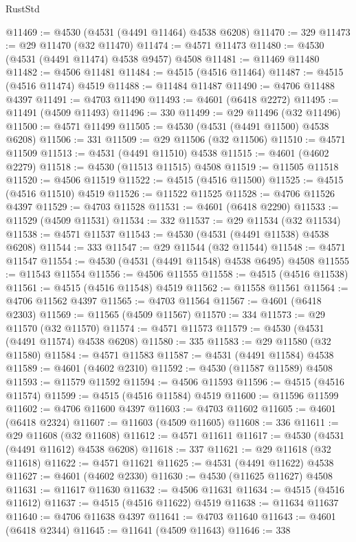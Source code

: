 \begin{lexlean}{RustStd}
\begin{coremodule}
{\begin{coremodule}
{{{{{{{{{{{{{{{{{{{{{{{{{{{{{{{{{{{{{{{{{{{{{{{{{{{{{{{@11469 := @4530 (@4531 (@4491 @11464) @4538 @6208)
@11470 := 329
@11473 := @29 @11470 (@32 @11470)
@11474 := @4571 @11473
@11480 := @4530 (@4531 (@4491 @11474) @4538 @9457) @4508
@11481 := @11469 @11480
@11482 := @4506 @11481
@11484 := @4515 (@4516 @11464)
@11487 := @4515 (@4516 @11474) @4519
@11488 := @11484 @11487
@11490 := @4706 @11488 @4397
@11491 := @4703 @11490
@11493 := @4601 (@6418 @2272)
@11495 := @11491 (@4509 @11493)
@11496 := 330
@11499 := @29 @11496 (@32 @11496)
@11500 := @4571 @11499
@11505 := @4530 (@4531 (@4491 @11500) @4538 @6208)
@11506 := 331
@11509 := @29 @11506 (@32 @11506)
@11510 := @4571 @11509
@11513 := @4531 (@4491 @11510) @4538
@11515 := @4601 (@4602 @2279)
@11518 := @4530 (@11513 @11515) @4508
@11519 := @11505 @11518
@11520 := @4506 @11519
@11522 := @4515 (@4516 @11500)
@11525 := @4515 (@4516 @11510) @4519
@11526 := @11522 @11525
@11528 := @4706 @11526 @4397
@11529 := @4703 @11528
@11531 := @4601 (@6418 @2290)
@11533 := @11529 (@4509 @11531)
@11534 := 332
@11537 := @29 @11534 (@32 @11534)
@11538 := @4571 @11537
@11543 := @4530 (@4531 (@4491 @11538) @4538 @6208)
@11544 := 333
@11547 := @29 @11544 (@32 @11544)
@11548 := @4571 @11547
@11554 := @4530 (@4531 (@4491 @11548) @4538 @6495) @4508
@11555 := @11543 @11554
@11556 := @4506 @11555
@11558 := @4515 (@4516 @11538)
@11561 := @4515 (@4516 @11548) @4519
@11562 := @11558 @11561
@11564 := @4706 @11562 @4397
@11565 := @4703 @11564
@11567 := @4601 (@6418 @2303)
@11569 := @11565 (@4509 @11567)
@11570 := 334
@11573 := @29 @11570 (@32 @11570)
@11574 := @4571 @11573
@11579 := @4530 (@4531 (@4491 @11574) @4538 @6208)
@11580 := 335
@11583 := @29 @11580 (@32 @11580)
@11584 := @4571 @11583
@11587 := @4531 (@4491 @11584) @4538
@11589 := @4601 (@4602 @2310)
@11592 := @4530 (@11587 @11589) @4508
@11593 := @11579 @11592
@11594 := @4506 @11593
@11596 := @4515 (@4516 @11574)
@11599 := @4515 (@4516 @11584) @4519
@11600 := @11596 @11599
@11602 := @4706 @11600 @4397
@11603 := @4703 @11602
@11605 := @4601 (@6418 @2324)
@11607 := @11603 (@4509 @11605)
@11608 := 336
@11611 := @29 @11608 (@32 @11608)
@11612 := @4571 @11611
@11617 := @4530 (@4531 (@4491 @11612) @4538 @6208)
@11618 := 337
@11621 := @29 @11618 (@32 @11618)
@11622 := @4571 @11621
@11625 := @4531 (@4491 @11622) @4538
@11627 := @4601 (@4602 @2330)
@11630 := @4530 (@11625 @11627) @4508
@11631 := @11617 @11630
@11632 := @4506 @11631
@11634 := @4515 (@4516 @11612)
@11637 := @4515 (@4516 @11622) @4519
@11638 := @11634 @11637
@11640 := @4706 @11638 @4397
@11641 := @4703 @11640
@11643 := @4601 (@6418 @2344)
@11645 := @11641 (@4509 @11643)
@11646 := 338
}}}}}}}}}}}}}}}}}}}}}}}}}}}}}}}}}}}}}}}}}}}}}}}}}}}}}}}
\end{coremodule}}
\end{coremodule}
\end{lexlean}
